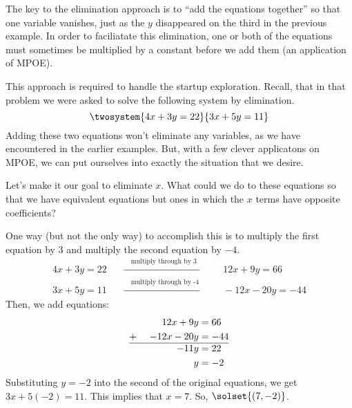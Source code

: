 The key to the elimination approach is to ``add the equations together'' so that one variable vanishes, just as the $y$ disappeared on the third in the previous example. In order to faciliatate this elimination, one or both of the equations must sometimes be multiplied by a constant before we add them (an application of MPOE).

This approach is required to handle the startup exploration. Recall, that in that problem we were asked to solve the following system by elimination.\[\twosystem{4x+3y=22}{3x+5y=11}\]
Adding these two equations won't eliminate any variables, as we have encountered in the earlier examples. But, with a few clever applicatons on MPOE, we can put ourselves into exactly the situation that we desire.

Let's make it our goal to eliminate $x$. What could we do to these equations so that we have equivalent equations but ones in which the $x$ terms have opposite coefficients?

One way (but not the only way) to accomplish this is to multiply the first equation by 3 and multiply the second equation by $-4$.
\[\begin{array}{lcl}
4x+3y=22
& \quad \xrightarrow{\quad\text{multiply through by 3}\quad}
& \quad 12x + 9y = 66
\\
3x+5y=11
& \quad \xrightarrow{\quad\text{multiply through by -4}\quad}
& \quad -12x - 20y = -44
\end{array}\]
Then, we add equations:
\[
\begin{aligned}
		&&12x + 9y		&= 66\\
+~		&&-12x - 20y	&= -44\\\hline
		&&-11y	& = 22\\
		&&y	& = -2\\
\end{aligned}
\]
Substituting $y=-2$ into the second of the original equations, we get $3x + 5(-2) = 11$. This implies that $x=7$. So, $\solset{(7,-2)}$.


